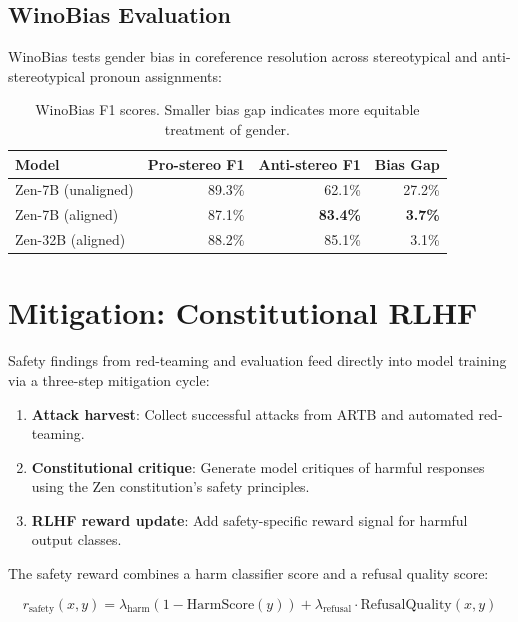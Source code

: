 \documentclass[11pt,a4paper]{article}
\begin{document}
\subsection{WinoBias Evaluation}

WinoBias tests gender bias in coreference resolution across stereotypical and
anti-stereotypical pronoun assignments:

\begin{table}[H]
\centering
\begin{tabular}{lrrr}
\toprule
\textbf{Model} & \textbf{Pro-stereo F1} & \textbf{Anti-stereo F1} & \textbf{Bias Gap} \\
\midrule
Zen-7B (unaligned) & 89.3\% & 62.1\% & 27.2\% \\
Zen-7B (aligned) & 87.1\% & \textbf{83.4\%} & \textbf{3.7\%} \\
Zen-32B (aligned) & 88.2\% & 85.1\% & 3.1\% \\
\bottomrule
\end{tabular}
\caption{WinoBias F1 scores. Smaller bias gap indicates more equitable treatment of gender.}
\end{table}

\section{Mitigation: Constitutional RLHF}

Safety findings from red-teaming and evaluation feed directly into model training
via a three-step mitigation cycle:

\begin{enumerate}
  \item \textbf{Attack harvest}: Collect successful attacks from ARTB and automated red-teaming.
  \item \textbf{Constitutional critique}: Generate model critiques of harmful responses using
    the Zen constitution's safety principles.
  \item \textbf{RLHF reward update}: Add safety-specific reward signal for harmful output classes.
\end{enumerate}

The safety reward combines a harm classifier score and a refusal quality score:

\begin{equation}
r_\text{safety}(x, y) = \lambda_\text{harm}(1 - \text{HarmScore}(y)) + \lambda_\text{refusal} \cdot \text{RefusalQuality}(x, y)
\end{equation}
\end{document}
